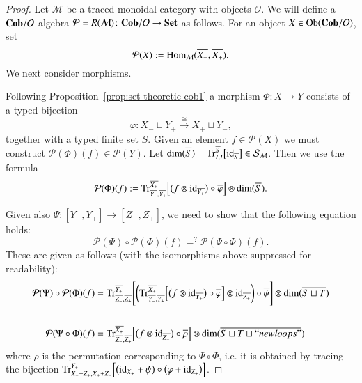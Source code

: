 \documentclass{amsart}
\def\tn{\textnormal}
\def\mc{\mathcal}
\def\Hom{\tn{Hom}}
\def\Ob{\tn{Ob}}
\def\dim{\tn{dim}}
\def\Trace{\tn{Tr}}
\def\to{\rightarrow}
\def\taking{\colon}
\def\too{\longrightarrow}
\def\iso{\cong}
\def\ol{\overline}
\newcommand{\To}[1]{\xrightarrow{#1}}
\def\id{\tn{id}}
\def\Cob{{\bf Cob}}
\def\Set{{\bf Set}}
\def\mcM{\mc{M}}
\def\mcO{\mc{O}}
\def\mcP{\mc{P}}
\def\mcS{\mc{S}}
\newcommand{\inp}[1]{{#1_-}}
\newcommand{\outp}[1]{{#1_+}}
\newcommand{\vLst}[1]{\ol{#1}}
\newcommand{\vinp}[1]{\vLst{\inp{#1}}}
\newcommand{\voutp}[1]{\vLst{\outp{#1}}}
\theoremstyle{remark}
\theoremstyle{definition}
\begin{document}
\begin{proof}

Let $\mcM$ be a traced monoidal category with objects $\mcO$. We will define a $\Cob/\mcO$-algebra $\mcP=R(\mcM)\taking\Cob/\mcO\to\Set$ as follows. For an object $X\in\Ob(\Cob/\mcO)$, set 
$$\mcP(X):=\Hom_{\mcM}(\vinp{X},\voutp{X}).$$
We next consider morphisms.


Following Proposition~\ref{prop:set theoretic cob1} a morphism $\Phi\taking X\too Y$ consists of a typed bijection 
$$\varphi\taking\inp{X}\sqcup \outp{Y}\To{\iso}\outp{X}\sqcup \inp{Y},$$ 
together with a typed finite set $S$. Given an element $f\in\mcP(X)$ we must construct $\mcP(\Phi)(f)\in\mcP(Y)$. Let $\dim(\ol{S})=\Trace^{\ol{S}}_{I,I}\big[\id_{\ol{S}}\big]\in\mcS_\mcM$. Then we use the formula
$$\mcP(\Phi)(f):=
\Trace^{\ol{X_+}}_{\ol{Y_-},\ol{Y_+}}\Big[\big(f\otimes\id_{\ol{Y_+}}\big)\circ\ol{\varphi}\Big]
\otimes\dim(\ol{S}).	
$$

Given also $\Psi\taking[\inp{Y},\outp{Y}]\too[\inp{Z},\outp{Z}]$, we need to show that the following equation holds: 
$$\mcP(\Psi)\circ\mcP(\Phi)(f)=^?\mcP(\Psi\circ\Phi)(f).$$
These are given as follows (with the isomorphisms above suppressed for readability):
\begin{align}
\label{eq:composition 1}
\mcP(\Psi)\circ\mcP(\Phi)(f)&=
\Trace^{\ol{Y_+}}_{\ol{Z_-},\ol{Z_+}}
\Bigg[\bigg(
\Trace^{\ol{X_+}}_{\ol{Y_-},\ol{Y_+}}\Big[\big(f\otimes\id_{\ol{Y_+}}\big)\circ\ol{\varphi}\Big]\otimes\id_{\ol{Z_+}}\bigg)\circ\ol{\psi}
\Bigg]
\otimes\dim(\ol{S\sqcup T})
\\\nonumber\\
\label{eq:composition 2}
\mcP(\Psi\circ\Phi)(f)&=
\Trace^{\ol{X_+}}_{\ol{Z_-},\ol{Z_+}}\Big[\big(f\otimes\id_{\ol{Z_+}}\big)\circ\ol{\rho}\Big]\otimes\dim(\ol{S\sqcup T\sqcup ``newloops"})
\end{align}
where $\rho$ is the permutation corresponding to $\Psi\circ\Phi$, i.e. it is obtained by tracing the bijection $\Trace^{Y_+}_{X_-+Z_+,X_++Z_-}\Big[\big(\id_{X_+}+\psi\big)\circ\big(\varphi+\id_{Z_+}\big)\Big]$.


\end{proof}
\end{document}

